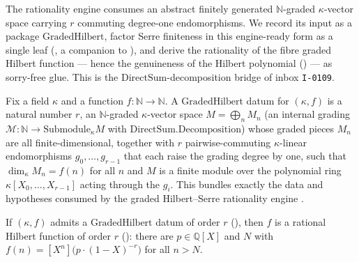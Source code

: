 The rationality engine  consumes an
abstract finitely generated \(\mathbb{N}\)-graded \(\kappa\)-vector space
carrying \(r\) commuting degree-one endomorphisms.  We record its input as a
package \(\mathrm{GradedHilbert}\), factor Serre finiteness in this engine-ready
form as a single leaf (, a companion to
), and derive the rationality of the fibre
graded Hilbert function --- hence the genuineness of the Hilbert polynomial
() --- as sorry-free glue.  This is the
\(\mathrm{DirectSum}\)-decomposition bridge of inbox \texttt{I-0109}.

\begin{definition}
  \label{def:gradedHilbert}
  \leanok
  Fix a field \(\kappa\) and a function \(f : \mathbb{N} \to \mathbb{N}\).  A
  \(\mathrm{GradedHilbert}\) datum for \((\kappa, f)\) is a natural number \(r\),
  an \(\mathbb{N}\)-graded \(\kappa\)-vector space \(M = \bigoplus_n M_n\) (an
  internal grading \(\mathcal{M} : \mathbb{N} \to \mathrm{Submodule}_\kappa M\)
  with \(\mathrm{DirectSum.Decomposition}\)) whose graded pieces \(M_n\) are all
  finite-dimensional, together with \(r\) pairwise-commuting \(\kappa\)-linear
  endomorphisms \(g_0, \dots, g_{r-1}\) that each raise the grading degree by one,
  such that \(\dim_\kappa M_n = f(n)\) for all \(n\) and \(M\) is a finite module
  over the polynomial ring \(\kappa[X_0, \dots, X_{r-1}]\) acting through the
  \(g_i\).  This bundles exactly the data and hypotheses consumed by the graded
  Hilbert--Serre rationality engine .
\end{definition}

\begin{lemma}
  \label{lem:gradedHilbert_isRatHilb}
  \leanok
  If \((\kappa, f)\) admits a \(\mathrm{GradedHilbert}\) datum of order \(r\)
  (), then \(f\) is a rational Hilbert function of order
  \(r\) (): there are \(p \in \mathbb{Q}[X]\) and \(N\) with
  \(f(n) = [X^n]\bigl(p \cdot (1-X)^{-r}\bigr)\) for all \(n > N\).
\end{lemma}

